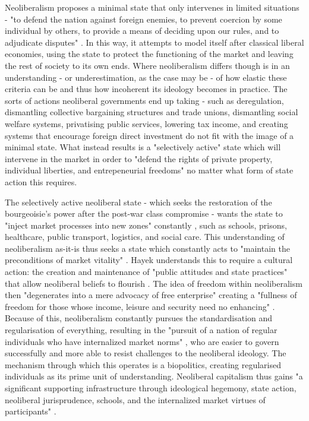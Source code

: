 Neoliberalism proposes a minimal state that only intervenes in limited situations - "to defend the nation against foreign enemies, to prevent coercion by some individual by others, to provide a means of deciding upon our rules, and to adjudicate disputes" \citep[53]{connolly_fragility_2013}. In this way, it attempts to model itself after classical liberal economies, using the state to protect the functioning of the market and leaving the rest of society to its own ends. Where neoliberalism differs though is in an understanding - or underestimation, as the case may be - of how elastic these criteria can be and thus how incoherent its ideology becomes in practice. The sorts of actions neoliberal governments end up taking - such as deregulation, dismantling collective bargaining structures and trade unions, dismantling social welfare systems, privatising public services, lowering tax income, and creating systems that encourage foreign direct
investment \citep[52]{harvey_brief_2007} do not fit with the image of a minimal state. What instead results is a "selectively active" state \citep[21]{connolly_fragility_2013} which will intervene in the market in order to "defend the rights of private property, individual liberties, and entrepeneurial freedoms" \citep[49]{harvey_brief_2007} no matter what form of state action this requires.

The selectively active neoliberal state - which seeks the restoration of the bourgeoisie's power after the post-war class compromise - wants the state to "inject market processes into new zones" constantly \citep[21]{connolly_fragility_2013}, such as schools, prisons, healthcare, public transport, logistics, and social care. This understanding of neoliberalism as-it-is thus seeks a state which constantly acts to "maintain the preconditions of market vitality" \citep[60]{connolly_fragility_2013}. Hayek understands this to require a cultural action: the creation and maintenance of "public attitudes and state practices" that allow neoliberal beliefs to flourish \citep[57]{connolly_fragility_2013}. The idea of freedom within neoliberalism then "degenerates into a mere advocacy of free enterprise" creating a "fullness of freedom for those whose income, leisure and security need no enhancing" \citep[265]{polanyi_great_1944}. Because of this, neoliberalism constantly pursues the standardisation and regularisation of everything, resulting in the "pursuit of a nation of regular individuals who have internalized market norms" \citep[53]{connolly_fragility_2013}, who are easier to govern successfully and more able to resist challenges to the neoliberal ideology. The mechanism through which this operates is a biopolitics, creating regularised individuals as its prime unit of understanding. Neoliberal capitalism thus gains "a significant supporting infrastructure through ideological hegemony, state action, neoliberal jurisprudence, schools, and the internalized market virtues of participants" \citep[62]{connolly_fragility_2013}.

